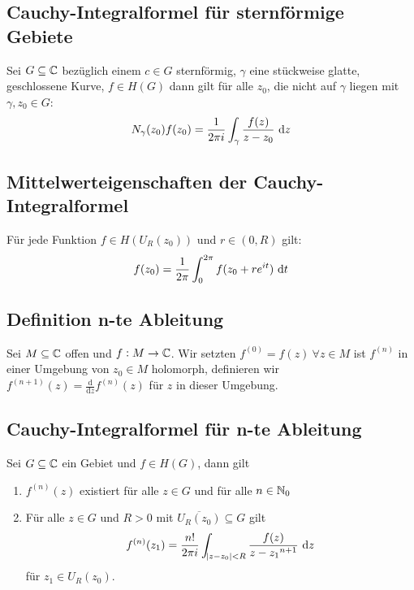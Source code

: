 \subsection{Cauchy-Integralformel für sternförmige Gebiete}
Sei $G \subseteq \mathbb{C}$ bezüglich einem $c \in G$ sternförmig, $\gamma$ eine stückweise glatte, geschlossene Kurve,
$f \in H(G)$ dann gilt für alle $z_0$, die nicht auf $\gamma$ liegen mit $\gamma, z_0 \in G$:
\begin{equation*}
    N_\gamma (z_0) f(z_0) = \frac{1}{2 \pi i} \int_\gamma \frac{f(z)}{z-z_0} \text{ d}z
\end{equation*}

\subsection{Mittelwerteigenschaften der Cauchy-Integralformel}
Für jede Funktion $f \in H(U_R(z_0))$ und $r \in (0, R)$ gilt:
\begin{equation*}
    f(z_0) = \frac{1}{2 \pi} \int_0^{2\pi} f(z_0 + r e^{it}) \text{ d}t
\end{equation*}

\subsection{Definition n-te Ableitung}
Sei $M \subseteq \mathbb{C}$ offen und $f: M \to \mathbb{C}$. Wir setzten $f^{(0)} = f(z)\ \forall z \in M$ ist $f^{(n)}$ in einer
Umgebung von $z_0 \in M$ holomorph, definieren wir 
$f^{(n+1)}(z) = \frac{\text{d}}{\text{d}z} f^{(n)}(z)$ für $z$ in dieser Umgebung.

\subsection{Cauchy-Integralformel für n-te Ableitung}
Sei $G \subseteq \mathbb{C}$ ein Gebiet und $f \in H(G)$, dann gilt
\begin{enumerate}
    \item $f^{(n)}(z)$ existiert für alle $z \in G$ und für alle $n \in \mathbb{N}_0$
    \item Für alle $z \in G$ und $R > 0$ mit $\overline{U_R(z_0)} \subseteq G$ gilt
        \begin{equation*}
            f^{(n)}(z_1) = \frac{n!}{2 \pi i} \int_{\abs{z-z_0} < R} \frac{f(z)}{{z-z_1}^{n+1}} \text{ d}z
        \end{equation*}
        für $z_1 \in U_R(z_0)$.
\end{enumerate}
